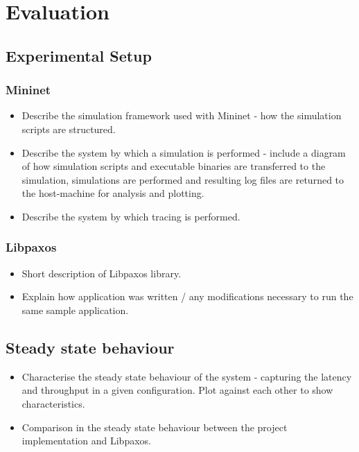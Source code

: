 \chapter{Evaluation}

\section{Experimental Setup}
\subsection{Mininet}
\begin{itemize}
  \item Describe the simulation framework used with Mininet - how the simulation scripts are structured.
  \item Describe the system by which a simulation is performed - include a diagram of how simulation scripts and executable binaries are transferred to the simulation, simulations are performed and resulting log files are returned to the host-machine for analysis and plotting.
  \item Describe the system by which tracing is performed.
\end{itemize}

\subsection{Libpaxos}
\begin{itemize}
  \item Short description of Libpaxos library.
  \item Explain how application was written / any modifications necessary to run the same sample application.
\end{itemize}

\section{Steady state behaviour}
\begin{itemize}
   \item Characterise the steady state behaviour of the system - capturing the latency and throughput in a given configuration. Plot against each other to show characteristics.
   \item Comparison in the steady state behaviour between the project implementation and Libpaxos.
\end{itemize}

